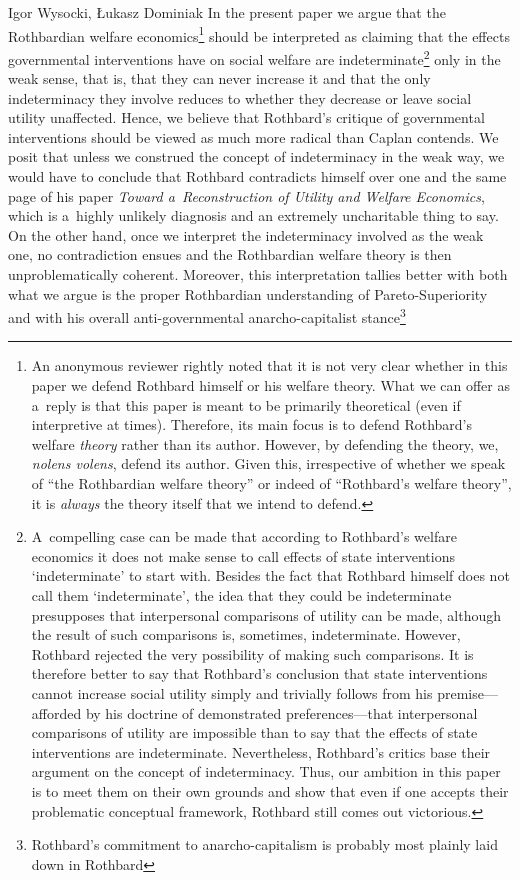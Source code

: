 \begin{artengenv}{Igor Wysocki, Łukasz Dominiak}
In the present paper we argue that the Rothbardian welfare economics\footnote{An anonymous reviewer rightly noted that it is not very clear whether in this paper we defend Rothbard himself or his welfare theory. What we can offer as a~reply is that this paper is meant to be primarily theoretical (even if interpretive at times). Therefore, its main focus is to defend Rothbard's welfare \textit{theory} rather than its author. However, by defending the theory, we, \textit{nolens volens}, defend its author. Given this, irrespective of whether we speak of ``the Rothbardian welfare theory'' or indeed of ``Rothbard's welfare theory'', it is \textit{always} the theory itself that we intend to defend. } should be interpreted as claiming that the effects governmental interventions have on social welfare are indeterminate\footnote{A~compelling case can be made that according to Rothbard's welfare economics it does not make sense to call effects of state interventions ‘indeterminate' to start with. Besides the fact that Rothbard himself does not call them ‘indeterminate', the idea that they could be indeterminate presupposes that interpersonal comparisons of utility can be made, although the result of such comparisons is, sometimes, indeterminate. However, Rothbard rejected the very possibility of making such comparisons. It is therefore better to say that Rothbard's conclusion that state interventions cannot increase social utility simply and trivially follows from his premise---afforded by his doctrine of demonstrated preferences---that interpersonal comparisons of utility are impossible than to say that the effects of state interventions are indeterminate. Nevertheless, Rothbard's critics base their argument on the concept of indeterminacy. Thus, our ambition in this paper is to meet them on their own grounds and show that even if one accepts their problematic conceptual framework, Rothbard still comes out victorious.} only in the weak sense, that is, that they can never increase it and that the only indeterminacy they involve reduces to whether they decrease or leave social utility unaffected. Hence, we believe that Rothbard's critique of governmental interventions should be viewed as much more radical than Caplan contends. We posit that unless we construed the concept of indeterminacy in the weak way, we would have to conclude that Rothbard contradicts himself over one and the same page of his paper \textit{Toward a~Reconstruction of Utility and Welfare Economics}, which is a~highly unlikely diagnosis and an extremely uncharitable thing to say. On the other hand, once we interpret the indeterminacy involved as the weak one, no contradiction ensues and the Rothbardian welfare theory is then unproblematically coherent. Moreover, this interpretation tallies better with both what we argue is the proper Rothbardian understanding of Pareto-Superiority and with his overall anti-governmental anarcho-capitalist stance\footnote{Rothbard's commitment to anarcho-capitalism is probably most plainly laid down in Rothbard 
}
\end{artengenv}
